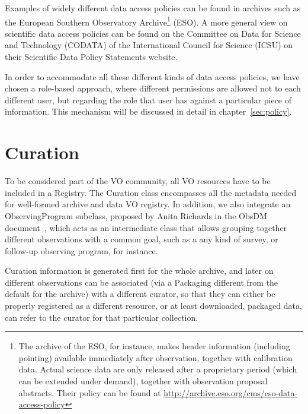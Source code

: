 		Examples of widely different data access policies can be
		found in archives such as the European Southern Observatory
		Archive\footnote{The archive of the ESO, for instance, makes
		header information (including pointing) available
		immediately after observation, together with calibration
		data. Actual science data are only released after a
		proprietary period (which can be extended under demand),
		together with observation proposal abstracts. Their policy
		can be found at
		\url{http://archive.eso.org/cms/eso-data-access-policy}}
		(ESO). A more general view on scientific data access
		policies can be found on the Committee on Data for Science
		and Technology (CODATA) of the International Council for
		Science (ICSU) on their Scientific Data Policy Statements
	website.
		
		In order to accommodate all these different kinds of data
		access policies, we have chosen a role-based approach,
		where different permissions are allowed not to each
		different user, but regarding the role that user has
		against a particular piece of information. This mechanism
		will be discussed in detail in chapter~\ref{sec:policy}.
		
	
	\section{Curation} %
		
		To be considered part of the VO community, all VO resources
		have to be included in a Registry. The Curation class
		encompasses all the metadata needed for well-formed archive
		and data VO registry. In addition, we also integrate an
		ObservingProgram subclass, proposed by Anita Richards in
		the ObsDM document~\cite{2005dmo..rept.....M}, which acts
		as an intermediate class that allows grouping together
		different observations with a common goal, such as a any
		kind of survey, or follow-up observing program, for
		instance.
		
		Curation information is generated first for the whole
		archive, and later on different observations can be
		associated (via a Packaging different from the default
		for the archive) with a different curator, so that they
		can either be properly registered as a different resource,
		or at least downloaded, packaged data, can refer to the
		curator for that particular collection.
		
	
